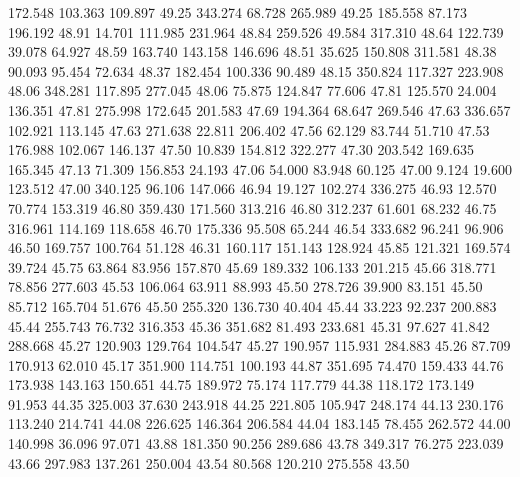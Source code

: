  172.548  103.363  109.897        49.25
 343.274   68.728  265.989        49.25
 185.558   87.173  196.192        48.91
  14.701  111.985  231.964        48.84
 259.526   49.584  317.310        48.64
 122.739   39.078   64.927        48.59
 163.740  143.158  146.696        48.51
  35.625  150.808  311.581        48.38
  90.093   95.454   72.634        48.37
 182.454  100.336   90.489        48.15
 350.824  117.327  223.908        48.06
 348.281  117.895  277.045        48.06
  75.875  124.847   77.606        47.81
 125.570   24.004  136.351        47.81
 275.998  172.645  201.583        47.69
 194.364   68.647  269.546        47.63
 336.657  102.921  113.145        47.63
 271.638   22.811  206.402        47.56
  62.129   83.744   51.710        47.53
 176.988  102.067  146.137        47.50
  10.839  154.812  322.277        47.30
 203.542  169.635  165.345        47.13
  71.309  156.853   24.193        47.06
  54.000   83.948   60.125        47.00
   9.124   19.600  123.512        47.00
 340.125   96.106  147.066        46.94
  19.127  102.274  336.275        46.93
  12.570   70.774  153.319        46.80
 359.430  171.560  313.216        46.80
 312.237   61.601   68.232        46.75
 316.961  114.169  118.658        46.70
 175.336   95.508   65.244        46.54
 333.682   96.241   96.906        46.50
 169.757  100.764   51.128        46.31
 160.117  151.143  128.924        45.85
 121.321  169.574   39.724        45.75
  63.864   83.956  157.870        45.69
 189.332  106.133  201.215        45.66
 318.771   78.856  277.603        45.53
 106.064   63.911   88.993        45.50
 278.726   39.900   83.151        45.50
  85.712  165.704   51.676        45.50
 255.320  136.730   40.404        45.44
  33.223   92.237  200.883        45.44
 255.743   76.732  316.353        45.36
 351.682   81.493  233.681        45.31
  97.627   41.842  288.668        45.27
 120.903  129.764  104.547        45.27
 190.957  115.931  284.883        45.26
  87.709  170.913   62.010        45.17
 351.900  114.751  100.193        44.87
 351.695   74.470  159.433        44.76
 173.938  143.163  150.651        44.75
 189.972   75.174  117.779        44.38
 118.172  173.149   91.953        44.35
 325.003   37.630  243.918        44.25
 221.805  105.947  248.174        44.13
 230.176  113.240  214.741        44.08
 226.625  146.364  206.584        44.04
 183.145   78.455  262.572        44.00
 140.998   36.096   97.071        43.88
 181.350   90.256  289.686        43.78
 349.317   76.275  223.039        43.66
 297.983  137.261  250.004        43.54
  80.568  120.210  275.558        43.50
